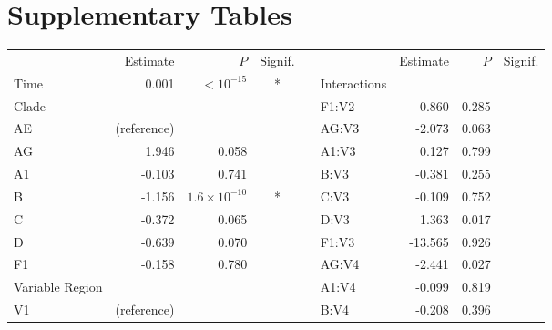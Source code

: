 \documentclass[12pt]{article}
\begin{document}
\clearpage

\section * {Supplementary Tables}

\begin{table}[htbp]
\renewcommand{\arraystretch}{1.15}
  \centering
  \begin{tabular}{lrrcclrrc}
    \hline
   & Estimate & $P$ & Signif.   &&  & Estimate & $P$ & Signif. \\ 
    \cline{1-4} \cline{6-9}
    
    Time & 0.001 & $<10^{-15}$ & * & & Interactions \\ 
	Clade  &  &  &  &  & \hspace{1em}F1:V2 & -0.860 & 0.285 &  \\ 
  \hspace{1em}AE &  (reference) &  &  && \hspace{1em}AG:V3 & -2.073 & 0.063 &  \\ 
  \hspace{1em}AG & 1.946 & 0.058 &  &  &\hspace{1em}A1:V3 & 0.127 & 0.799 &  \\ 
  \hspace{1em}A1 & -0.103 & 0.741 &  & &\hspace{1em}B:V3 & -0.381 & 0.255 &  \\ 
  \hspace{1em}B & -1.156 & $1.6\times 10^{-10}$ & * & &\hspace{1em}C:V3 & -0.109 & 0.752 & \\ 
  \hspace{1em}C & -0.372 & 0.065 & &&\hspace{1em}D:V3 & 1.363 & 0.017 &  \\ 
  \hspace{1em}D & -0.639 & 0.070 & &&\hspace{1em}F1:V3 & -13.565 & 0.926 & \\ 
  \hspace{1em}F1 & -0.158 & 0.780 && & \hspace{1em}AG:V4 & -2.441 & 0.027 & \\ 
  Variable Region  & & & & &\hspace{1em}A1:V4 & -0.099 & 0.819 & \\ 
  \hspace{1em}V1 & (reference) & & & &\hspace{1em}B:V4 & -0.208 & 0.396 & \\

\end{tabular}
\end{table}
\end{document}
